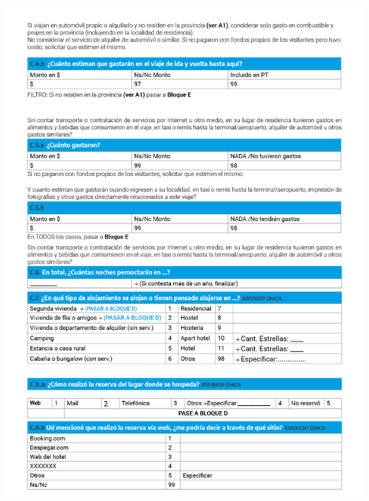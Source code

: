 \documentclass[
]{book}
\begin{document}
\begin{center}\includegraphics[width=1\linewidth]{imagenes/graf04} \end{center}
\end{document}
